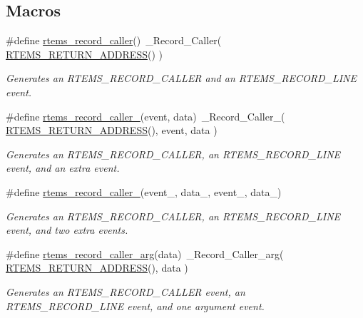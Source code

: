 \subsection*{Macros}
\begin{DoxyCompactItemize}
\item 
\#define \mbox{\hyperlink{group__RTEMSRecord_gad89cfc2dd4b452228639eb2c976aff36}{rtems\+\_\+record\+\_\+caller}}()~\+\_\+\+Record\+\_\+\+Caller( \mbox{\hyperlink{group__RTEMSScoreBaseDefs_ga70a1b8869a1ec49d30613af22ebc3f50}{R\+T\+E\+M\+S\+\_\+\+R\+E\+T\+U\+R\+N\+\_\+\+A\+D\+D\+R\+E\+SS}}() )
\begin{DoxyCompactList}\small\item\em Generates an R\+T\+E\+M\+S\+\_\+\+R\+E\+C\+O\+R\+D\+\_\+\+C\+A\+L\+L\+ER and an R\+T\+E\+M\+S\+\_\+\+R\+E\+C\+O\+R\+D\+\_\+\+L\+I\+NE event. \end{DoxyCompactList}\item 
\#define \mbox{\hyperlink{group__RTEMSRecord_gae9a52731b848ed38623ed5b658d14086}{rtems\+\_\+record\+\_\+caller\+\_}}(event,  data)~\+\_\+\+Record\+\_\+\+Caller\+\_( \mbox{\hyperlink{group__RTEMSScoreBaseDefs_ga70a1b8869a1ec49d30613af22ebc3f50}{R\+T\+E\+M\+S\+\_\+\+R\+E\+T\+U\+R\+N\+\_\+\+A\+D\+D\+R\+E\+SS}}(), event, data )
\begin{DoxyCompactList}\small\item\em Generates an R\+T\+E\+M\+S\+\_\+\+R\+E\+C\+O\+R\+D\+\_\+\+C\+A\+L\+L\+ER, an R\+T\+E\+M\+S\+\_\+\+R\+E\+C\+O\+R\+D\+\_\+\+L\+I\+NE event, and an extra event. \end{DoxyCompactList}\item 
\#define \mbox{\hyperlink{group__RTEMSRecord_gaccb677a7151eaa44056ea1a4ce41503c}{rtems\+\_\+record\+\_\+caller\+\_}}(event\+\_,  data\+\_,  event\+\_,  data\+\_)
\begin{DoxyCompactList}\small\item\em Generates an R\+T\+E\+M\+S\+\_\+\+R\+E\+C\+O\+R\+D\+\_\+\+C\+A\+L\+L\+ER, an R\+T\+E\+M\+S\+\_\+\+R\+E\+C\+O\+R\+D\+\_\+\+L\+I\+NE event, and two extra events. \end{DoxyCompactList}\item 
\#define \mbox{\hyperlink{group__RTEMSRecord_ga9f52499b07db2052cb3ed96e194c449b}{rtems\+\_\+record\+\_\+caller\+\_\+arg}}(data)~\+\_\+\+Record\+\_\+\+Caller\+\_\+arg( \mbox{\hyperlink{group__RTEMSScoreBaseDefs_ga70a1b8869a1ec49d30613af22ebc3f50}{R\+T\+E\+M\+S\+\_\+\+R\+E\+T\+U\+R\+N\+\_\+\+A\+D\+D\+R\+E\+SS}}(), data )
\begin{DoxyCompactList}\small\item\em Generates an R\+T\+E\+M\+S\+\_\+\+R\+E\+C\+O\+R\+D\+\_\+\+C\+A\+L\+L\+ER event, an R\+T\+E\+M\+S\+\_\+\+R\+E\+C\+O\+R\+D\+\_\+\+L\+I\+NE event, and one argument event. \end{DoxyCompactList}\item 

\end{DoxyCompactItemize}

